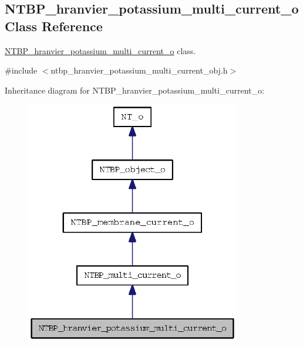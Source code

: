 \subsection{NTBP\_\-hranvier\_\-potassium\_\-multi\_\-current\_\-o Class Reference}
\label{class_n_t_b_p__hranvier__potassium__multi__current__o}


\hyperlink{class_n_t_b_p__hranvier__potassium__multi__current__o}{NTBP\_\-hranvier\_\-potassium\_\-multi\_\-current\_\-o} class.  




{\ttfamily \#include $<$ntbp\_\-hranvier\_\-potassium\_\-multi\_\-current\_\-obj.h$>$}



Inheritance diagram for NTBP\_\-hranvier\_\-potassium\_\-multi\_\-current\_\-o:
\nopagebreak
\begin{figure}[H]
\begin{center}
\leavevmode
\includegraphics[width=266pt]{class_n_t_b_p__hranvier__potassium__multi__current__o__inherit__graph}
\end{center}
\end{figure}


